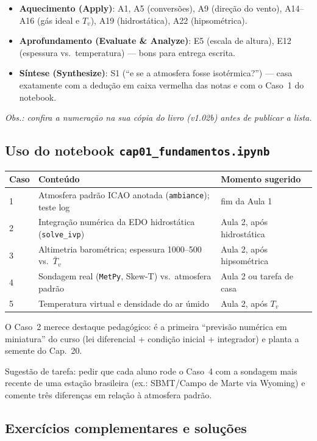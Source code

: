 \begin{itemize}
  \item \textbf{Aquecimento (Apply)}: A1, A5 (conversões), A9 (direção do
        vento), A14--A16 (gás ideal e $T_v$), A19 (hidrostática),
        A22 (hipsométrica).
  \item \textbf{Aprofundamento (Evaluate \& Analyze)}: E5 (escala de altura),
        E12 (espessura vs.\ temperatura) — bons para entrega escrita.
  \item \textbf{Síntese (Synthesize)}: S1 (``e se a atmosfera fosse
        isotérmica?'') — casa exatamente com a dedução em caixa vermelha das
        notas e com o Caso~1 do notebook.
\end{itemize}
\emph{Obs.: confira a numeração na sua cópia do livro (v1.02b) antes de
publicar a lista.}

\subsection*{Uso do notebook \texttt{cap01\_fundamentos.ipynb}}

\begin{center}
\begin{tabular}{lll}
\hline
Caso & Conteúdo & Momento sugerido \\
\hline
1 & Atmosfera padrão ICAO anotada (\texttt{ambiance}); teste log &
fim da Aula 1 \\
2 & Integração numérica da EDO hidrostática (\texttt{solve\_ivp}) &
Aula 2, após hidrostática \\
3 & Altimetria barométrica; espessura 1000--500 vs.\ $\bar T_v$ &
Aula 2, após hipsométrica \\
4 & Sondagem real (\texttt{MetPy}, Skew-T) vs.\ atmosfera padrão &
Aula 2 ou tarefa de casa \\
5 & Temperatura virtual e densidade do ar úmido &
Aula 2, após $T_v$ \\
\hline
\end{tabular}
\end{center}

O Caso~2 merece destaque pedagógico: é a primeira ``previsão numérica em
miniatura'' do curso (lei diferencial + condição inicial + integrador) e
planta a semente do Cap.~20.

Sugestão de tarefa: pedir que cada aluno rode o Caso~4 com a sondagem mais
recente de uma estação brasileira (ex.: SBMT/Campo de Marte via Wyoming) e
comente três diferenças em relação à atmosfera padrão.

\subsection*{Exercícios complementares e soluções}

